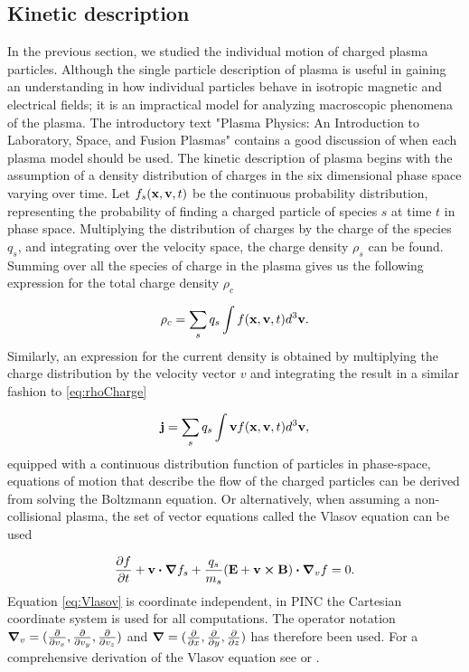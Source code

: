 \subsection{Kinetic description}
In the previous section, we studied the individual motion of charged plasma particles. Although the single particle description of plasma is useful in gaining an understanding in how individual particles behave in isotropic magnetic and electrical fields; it is an impractical model for analyzing macroscopic phenomena of the plasma. The introductory text "Plasma Physics: An Introduction to Laboratory, Space, and Fusion Plasmas" \parencite{Piel2017} contains a good discussion of when each plasma model should be used. The kinetic description of plasma begins with the assumption of a density distribution of charges in the six dimensional phase space varying over time. Let $f_s(\vb{x}, \vb{v}, t)$ be the continuous probability distribution, representing the probability of finding a charged particle of species $s$ at time $t$ in phase space. Multiplying the distribution of charges by the charge of the species $q_s$, and integrating over the velocity space, the charge density $\rho_s$ can be found. Summing over all the species of charge in the plasma gives us the following expression for the total charge density $\rho_c$

\begin{equation}\label{eq:rhoCharge}
    \rho_c = \sum_s q_s\int f(\vb{x}, \vb{v}, t) d^3\vb{v}.
\end{equation}
Similarly, an expression for the current density is obtained by multiplying the charge distribution by the velocity vector $v$ and integrating the result in a similar fashion to \eqref{eq:rhoCharge}

\begin{equation}
    \vb{j} = \sum_s q_s \int \vb{v} f(\vb{x}, \vb{v}, t) d^3 \vb{v},
\end{equation}
equipped with a continuous distribution function of particles in phase-space, equations of motion that describe the flow of the charged particles can be derived from solving the Boltzmann equation. Or alternatively, when assuming a non-collisional plasma, the set of vector equations called the Vlasov equation can be used


\begin{equation}\label{eq:Vlasov}
    \pdv{f}{t} + \vb{v} \vdot \grad{f_s} + \frac{q_s}{m_s} (\vb{E} + \vb{v} \cp \vb{B}) \vdot \grad_v{f} = 0.
\end{equation}
Equation \eqref{eq:Vlasov} is coordinate independent, in PINC the Cartesian coordinate system is used for all computations. The operator notation $\grad_v = (\pdv{v_x}, \pdv{v_y}, \pdv{v_z})$ and $\grad = (\pdv{x},\pdv{y},\pdv{z})$ has therefore been used. For a comprehensive derivation of the Vlasov equation see \parencite{Birdsall2004} or \parencite{Piel2017}.


